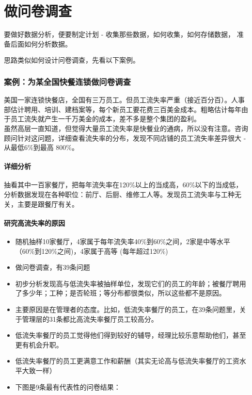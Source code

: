 \chapter{做问卷调查} %

要做好数据分析，便要制定计划 - 收集那些数据，如何收集，如何存储数据，
准备后面如何分析数据。

思路类似如何设计问卷调查，先看以下案例。

\hypertarget{ux6848ux4f8bux4e3aux67d0ux5168ux56fdux5febux9910ux8fdeux9501ux505aux95eeux5377ux8c03ux67e5}{%
\subsection{案例：为某全国快餐连锁做问卷调查}\label{ux6848ux4f8bux4e3aux67d0ux5168ux56fdux5febux9910ux8fdeux9501ux505aux95eeux5377ux8c03ux67e5}}

美国一家连锁快餐店，全国有三万员工。但员工流失率严重（接近百分百）。人事部估计聘用、培训、建档案等，每个新员工要花费三百美金成本。粗略估计每年由于员工流失就产生一千万美金的成本，差不多是整个集团的盈利。\\
虽然高层一直知道，但觉得大量员工流失率是快餐业的通病，所以没有注意。咨询顾问针对这问题，详细查看流失率的分布，发现不同店铺的员工流失率差异很大
- 从最低6\%到最高 800\%。\\
\hypertarget{ux4eceux5206ux6790ux5230ux884cux52a8}{%
\subsubsection{详细分析}\label{ux4eceux5206ux6790ux5230ux884cux52a8}}
抽看其中一百家餐厅，把每年流失率在120\%以上的当成高，60\%以下的当成低，分析数据发现在各种职位：前厅、后厨、维修工人等。发现员工流失率与工种无关，主要是跟餐厅有关。\\

\hypertarget{ux4eceux5206ux6790ux5230ux884cux52a8}{%
\subsubsection{研究高流失率的原因}\label{ux4eceux5206ux6790ux5230ux884cux52a8}}

\begin{itemize}
\tightlist
\item
  随机抽样10家餐厅，4家属于每年流失率40\%到60\%之间，2家是中等水平（60\%到120\%之间)，4家属于高等
  (每年超过120\%)
\item
  做问卷调查，有39条问题
\item
  初步分析发现高与低流失率被抽样单位，发现它们的员工的年龄；被餐厅聘用了多少年；工种；是否轮班；等分布都很类似，所以这些都不是原因。
\item
  主要原因是在管理者的态度。比如，低流失率餐厅的员工，在39条问题里，关于管理层的31条都比高流失率餐厅员工较高分。
\item
  低流失率餐厅的员工觉得他们得到较好的辅导，经理比较乐意帮助他们，甚至更有机会升职。
\item
  低流失率餐厅的员工更满意工作和薪酬（其实无论高与低流失率餐厅的工资水平大致一样）
\item
  下图是9条最有代表性的问卷结果：
\end{itemize}

